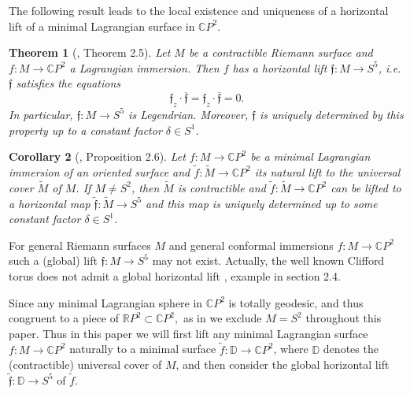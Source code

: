 \documentclass[a4paper,11pt]{amsart}
\newtheorem{theorem}{Theorem}[section]
\newtheorem{corollary}[theorem]{Corollary}
\theoremstyle{definition}
\numberwithin{equation}{section}
\newcommand{\R}{\mathbb{R}}
\newcommand{\C}{\mathbb{C}}
\newcommand{\D}{\mathbb{D}}
\newcommand{\f}{\mathfrak{f}}
\begin{document}
The following result leads to the local existence and uniqueness of a horizontal lift of a minimal Lagrangian surface in $\C P^2$. 

 \begin{theorem} [\cite{DoMaB1}, Theorem 2.5]
Let $M $ be a contractible Riemann surface and  $f: M \rightarrow {\mathbb C}P^2$ a Lagrangian immersion.
Then  $f$  has a horizontal lift ${\f}: M \rightarrow S^5 $, i.e. ${\f}$ satisfies the  equations
\begin{equation}\label{horizontal}
\f_z \cdot \overline{\f} = \f_{\bar z} \cdot \overline {\f} =0.
\end{equation}
In particular, ${\f}: M \rightarrow S^5 $ is Legendrian.
Moreover, $\f$ is uniquely determined by this property up to a constant factor $\delta \in S^1$. 
\end{theorem}



\begin{corollary} [\cite{DoMaB1}, Proposition 2.6]\label{Cor:globle-lift}
Let $f:M\rightarrow {\mathbb C}P^2$ be a minimal Lagrangian immersion of an oriented
surface and $\tilde{f}:\tilde{M} \rightarrow {\mathbb C}P^2$  its natural lift to the universal cover $\tilde{M}$ of $M$. 
If  $M \neq S^2$, then $\tilde{M} $ is contractible and 
$\tilde{f}:\tilde{M} \rightarrow {\mathbb C}P^2$  can be lifted to a horizontal map
$\tilde{\f}:\tilde{M} \rightarrow S^5$ and this map is uniquely determined up to some constant factor $\delta \in S^1$.
\end{corollary}

 For general Riemann surfaces $M$  and general conformal immersions 
 $f: M \rightarrow \C P^2$ such a (global) lift  $\f:M \rightarrow S^5$ may 
 not exist.
 Actually, the well known Clifford torus does not admit a global horizontal lift \cite{DoMaB1}, example in section 2.4.
 
Since any minimal Lagrangian sphere in $\mathbb{C}P^2$  is totally geodesic, 
and thus congruent to a piece of $\R P^2 \subset \C P^2,$ as in 
 \cite{DoMaB1}  
we exclude $M =S^2$ throughout this  paper.  
Thus in this paper we will first lift any minimal Lagrangian surface  $f: M \rightarrow\C P^2$
naturally to a minimal surface $\tilde{f}: \D \rightarrow \C P^2$, where $\D$ denotes the (contractible) 
universal cover of $M$, and then consider the global  horizontal lift $\tilde{\f} : \D \rightarrow S^5$ of $\tilde{f}$.

                                                  
\end{document}
